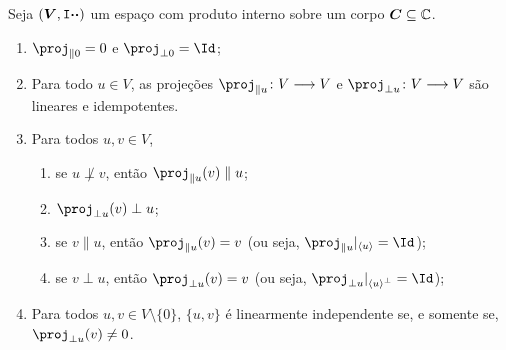 \begin{prop}
Seja $(\bm V,\mathtt I{\bm{\cdot}}{\bm{\cdot}})$ um espaço com produto interno sobre um corpo $\bm C \subseteq \mathbb{C}$.
	\begin{enumerate}
	\item $\proj_{\parallel 0} = 0$ e $\proj_{\perp 0} = \Id$;
	\item Para todo $u \in V$, as projeções $\proj_{\parallel u}\colon V \to V$ e $\proj_{\perp u}\colon V \to V$ são lineares e idempotentes.
	\item Para todos $u, v \in V$,
		\begin{enumerate}
		\item se $u \not\perp v$, então $\proj_{\parallel u}(v) \parallel u$;
		\item $\proj_{\perp u}(v) \perp u$;
		\item se $v \parallel u$, então $\proj_{\parallel u}(v) = v$ (ou seja, $\proj_{\parallel u}|_{\ger{u}} = \Id$);
		\item se $v \perp u$, então $\proj_{\perp u}(v) = v$ (ou seja, $\proj_{\perp u}|_{\ger{u}^\perp} = \Id$);
		\end{enumerate}
	\item Para todos $u,v \in V \setminus \{0\}$, $\{u,v\}$ é linearmente independente se, e somente se, $\proj_{\perp u}(v) \neq 0$.
	\end{enumerate}
\end{prop}
